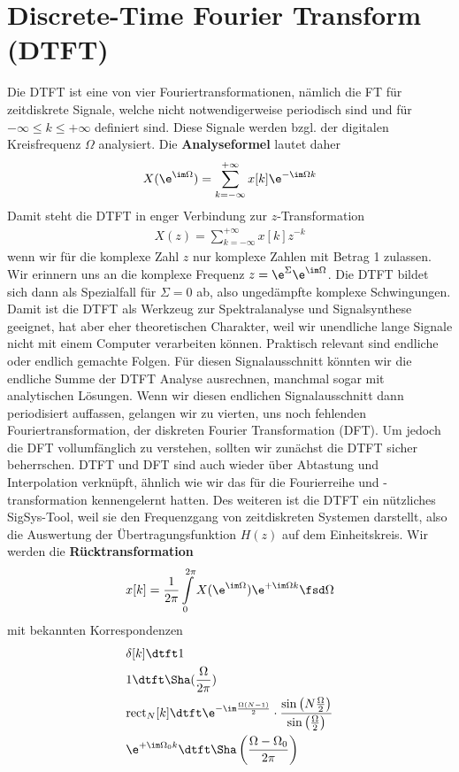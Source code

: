 \clearpage
\section{Discrete-Time Fourier Transform (DTFT)}

Die DTFT ist eine von vier Fouriertransformationen, nämlich die FT für
zeitdiskrete Signale, welche nicht notwendigerweise periodisch sind
und für $-\infty \leq k \leq +\infty$ definiert sind.
Diese Signale werden bzgl. der digitalen Kreisfrequenz $\Omega$ analysiert.
%
Die \textbf{Analyseformel} lautet daher
\begin{align}
X(\e^{\im\Omega}) = \sum\limits_{k=-\infty}^{+\infty} x[k] \e^{-\im\Omega k}
\end{align}
%
Damit steht die DTFT in enger Verbindung zur $z$-Transformation
\begin{align}
X(z) = \sum\limits_{k=-\infty}^{+\infty} x[k] z^{-k}
\end{align}
wenn wir für die komplexe Zahl $z$ nur komplexe Zahlen mit Betrag 1 zulassen.
%
Wir erinnern uns an die komplexe Frequenz $z=\e^\Sigma \e^{\im\Omega}$.
%
Die DTFT bildet sich dann als Spezialfall für $\Sigma=0$ ab, also ungedämpfte
komplexe Schwingungen.
%
Damit ist die DTFT als Werkzeug zur Spektralanalyse und Signalsynthese geeignet,
hat aber eher theoretischen Charakter, weil wir unendliche lange Signale
nicht mit einem Computer verarbeiten können.
%
Praktisch relevant sind endliche oder endlich gemachte Folgen.
%
Für diesen Signalausschnitt könnten wir die endliche Summe der DTFT Analyse
ausrechnen, manchmal sogar mit analytischen Lösungen.
%
Wenn wir diesen endlichen Signalausschnitt dann periodisiert auffassen,
gelangen wir zu vierten, uns noch fehlenden Fouriertransformation, der diskreten
Fourier Transformation (DFT).
%
Um jedoch die DFT vollumfänglich zu verstehen, sollten wir zunächst die DTFT
sicher beherrschen.
%
DTFT und DFT sind auch wieder über Abtastung und Interpolation
verknüpft, ähnlich wie wir das für die Fourierreihe und -transformation
kennengelernt hatten.
%
Des weiteren ist die DTFT ein nützliches SigSys-Tool, weil
sie den Frequenzgang von zeitdiskreten Systemen darstellt, also die Auswertung
der Übertragungsfunktion $H(z)$ auf dem Einheitskreis.
%
Wir werden die \textbf{Rücktransformation}
\begin{align}
x[k] = \frac{1}{2\pi} \int\limits_{0}^{2\pi} X(\e^{\im\Omega}) \e^{+\im\Omega k} \fsd \Omega
\end{align}
mit bekannten Korrespondenzen
\begin{align}
&\delta[k] \dtft 1\\
&1 \dtft \Sha(\frac{\Omega}{2\pi})\\
&\mathrm{rect}_N[k]
\dtft
\e^{-\im\frac{\Omega(N-1)}{2}}\cdot\frac{\sin\left(N\frac{\Omega}{2}\right)}{\sin\left(\frac{\Omega}{2}\right)}\\
&\e^{+\im \Omega_0 k} \dtft \Sha\left(\frac{\Omega-\Omega_0}{2\pi}\right)
\end{align}
